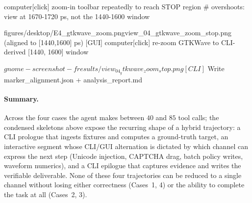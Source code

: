 \begin{guimode}
[GUI]  computer[click] zoom-in toolbar repeatedly to reach STOP region
       # overshoots: view at 1670-1720 ps, not the 1440-1600 window
\end{guimode}
\begin{trajactGUI}{figures/desktop/E4_gtkwave_zoom.png}{view\_04\_gtkwave\_zoom\_stop.png (aligned to [1440,1600] ps)}
[GUI]  computer[click] re-zoom GTKWave
       to CLI-derived [1440, 1600] window
\end{trajactGUI}
\begin{climode}
[CLI]  $ gnome-screenshot -f results/view_04_gtkwave_zoom_stop.png
[CLI]  $ Write marker_alignment.json + analysis_report.md
\end{climode}

\paragraph{Summary.}  Across the four cases the agent makes between $40$ and $85$ tool calls; the condensed skeletons above expose the recurring shape of a hybrid trajectory: a CLI prologue that ingests fixtures and computes a ground-truth target, an interactive segment whose CLI/GUI alternation is dictated by which channel can express the next step (Unicode injection, CAPTCHA drag, batch policy writes, waveform numerics), and a CLI epilogue that captures evidence and writes the verifiable deliverable. None of these four trajectories can be reduced to a single channel without losing either correctness (Cases~1, 4) or the ability to complete the task at all (Cases~2, 3).
